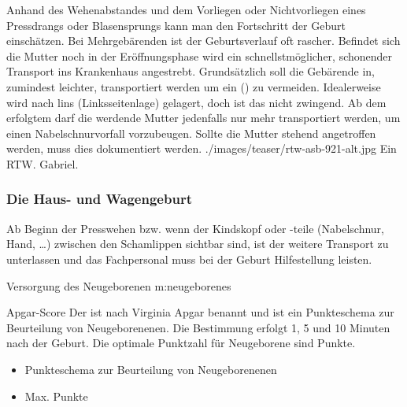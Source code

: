   
{%
Anhand des Wehenabstandes und dem Vorliegen oder
Nichtvorliegen eines Pressdrangs oder Blasensprungs kann
man den Fortschritt der Geburt einschätzen. 
Bei Mehrgebärenden ist der Geburtsverlauf oft rascher. 
Befindet
sich die Mutter noch in der Eröffnungsphase wird ein 
schnellstmöglicher, schonender Transport ins Krankenhaus 
angestrebt. Grundsätzlich soll die Gebärende in,
zumindest leichter,  transportiert werden
um ein 
() zu vermeiden.
Idealerweise wird nach lins (Linksseitenlage) gelagert, doch
ist das nicht zwingend. Ab dem erfolgtem  darf die
werdende Mutter jedenfalls nur mehr 
transportiert werden, um einen Nabelschnurvorfall vorzubeugen.
Sollte die Mutter stehend
angetroffen werden, muss dies dokumentiert werden.
}
{}
{./images/teaser/rtw-asb-921-alt.jpg}
{Ein RTW.}
{Gabriel.}



\subsubsection{Die Haus- und Wagengeburt}



Ab Beginn der Presswehen bzw. wenn der Kindskopf oder -teile
(Nabelschnur, Hand, \ldots) zwischen den Schamlippen
sichtbar sind, ist der weitere Transport zu
unterlassen und das Fachpersonal muss bei der Geburt
Hilfestellung leisten.



{Versorgung des Neugeborenen}
{m:neugeborenes}
{
}{}


{Apgar-Score}
{Der  ist nach Virginia Apgar
benannt und ist ein Punkteschema zur Beurteilung von
Neugeborenenen. Die Bestimmung erfolgt 1, 5 und 10 Minuten
nach der Geburt. Die optimale Punktzahl für Neugeborene sind
 Punkte. 
}
{
\begin{itemize}
  \item Punkteschema zur Beurteilung von 
  Neugeborenenen
  \item Max.  Punkte
\end{itemize}
}
{}
{}
{}

